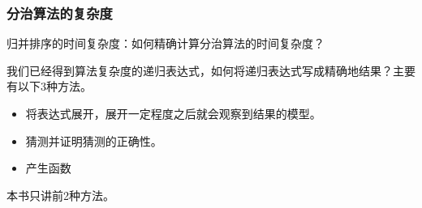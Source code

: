 \subsubsection{分治算法的复杂度}

	归并排序的时间复杂度：如何精确计算分治算法的时间复杂度？
	
	我们已经得到算法复杂度的递归表达式，如何将递归表达式写成精确地结果？主要有以下3种方法。
\begin{itemize}

\item 将表达式展开，展开一定程度之后就会观察到结果的模型。

\item 猜测并证明猜测的正确性。

\item 产生函数
\end{itemize}

	本书只讲前2种方法。
\newpage

